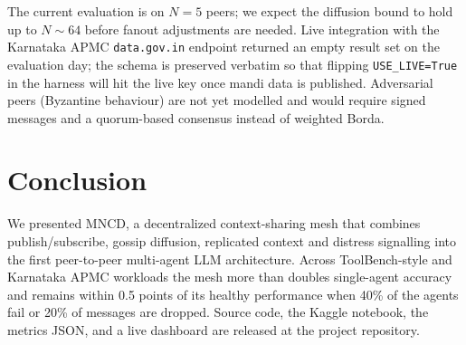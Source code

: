 \documentclass[conference]{IEEEtran}
\begin{document}
The current evaluation is on $N=5$ peers; we expect the diffusion bound to
hold up to $N \sim 64$ before fanout adjustments are needed. Live integration
with the Karnataka APMC \texttt{data.gov.in} endpoint returned an empty
result set on the evaluation day; the schema is preserved verbatim so that
flipping \texttt{USE\_LIVE=True} in the harness will hit the live key once
mandi data is published. Adversarial peers (Byzantine behaviour) are not yet
modelled and would require signed messages and a quorum-based consensus
instead of weighted Borda.

\section{Conclusion}

We presented MNCD, a decentralized context-sharing mesh that combines
publish/subscribe, gossip diffusion, replicated context and distress
signalling into the first peer-to-peer multi-agent LLM architecture. Across
ToolBench-style and Karnataka APMC workloads the mesh more than doubles
single-agent accuracy and remains within 0.5 points of its healthy
performance when 40\% of the agents fail or 20\% of messages are dropped.
Source code, the Kaggle notebook, the metrics JSON, and a live dashboard
are released at the project repository.
\end{document}
